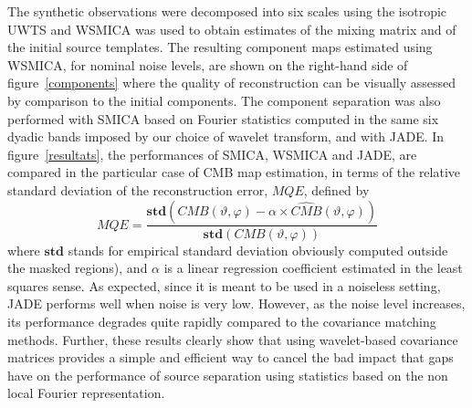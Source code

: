 The synthetic observations were decomposed into six scales using the isotropic UWTS and WSMICA was used to obtain estimates of the mixing matrix 
and of the initial source templates. The resulting component maps estimated using WSMICA, for nominal noise levels, are shown on the right-hand 
side of figure~\ref{components} where the quality of reconstruction can be visually assessed by comparison to the initial components. The component 
separation was also performed with SMICA based on Fourier statistics computed in the same six dyadic bands imposed by our choice of wavelet transform, 
and with JADE. In figure~\ref{resultats}, the performances of SMICA, WSMICA and JADE, are compared in the particular case of CMB map estimation, 
in terms of the relative standard deviation of the reconstruction error, $MQE$, defined by
 \begin{equation}
  MQE  = \frac{\mathbf{std}  ( CMB(\vartheta, \varphi)  - \alpha \times \widehat{CMB}(\vartheta, \varphi)  )}{\mathbf{std}  ( CMB(\vartheta, \varphi)   ) }
  \label{MQE}
\end{equation}  
where $\mathbf{std}$ stands for empirical standard deviation  obviously computed outside the masked regions), and $\alpha$ is a linear regression 
coefficient estimated in the least squares sense. As expected, since it is meant to be used in a noiseless setting, JADE performs well when noise 
is very low. However, as the noise level increases, its performance degrades quite rapidly compared to the covariance matching methods. Further, 
these results clearly show that using wavelet-based covariance matrices provides a simple and efficient way to cancel the bad impact that gaps 
have on the performance of source separation using statistics based on the non local Fourier representation. 

